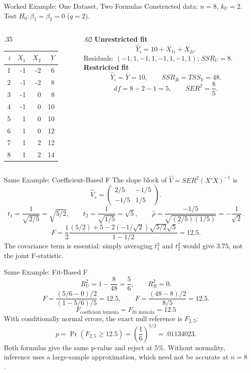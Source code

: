 \documentclass[notes,10pt, aspectratio=169]{beamer}
\begin{document}
\begin{frame}{Worked Example: One Dataset, Two Formulas}
Constructed data: $n=8$, $k_U=2$. Test $H_0:\beta_1=\beta_2=0$ ($q=2$).
\begin{columns}[T]
\begin{column}{.35\textwidth}
\begin{center}
\begin{tabular}{rrrr}
\toprule
$i$&$X_1$&$X_2$&$Y$\\\midrule
1&-1&-2&6\\
2&-1&-2&8\\
3&-1&0&8\\
4&-1&0&10\\
5&1&0&10\\
6&1&0&12\\
7&1&2&12\\
8&1&2&14\\\bottomrule
\end{tabular}
\end{center}
\end{column}
\begin{column}{.62\textwidth}
\textbf{Unrestricted fit}
\[\widehat Y_i=10+X_{1i}+X_{2i}.\]
Residuals: $(-1,1,-1,1,-1,1,-1,1)$; $SSR_U=8$.\\[1em]
\textbf{Restricted fit}
\[\widehat Y_i=\bar Y=10,\qquad SSR_R=TSS_Y=48.\]
\[df=8-2-1=5,\qquad SER^2=\frac85.\]
\end{column}
\end{columns}
\end{frame}

\begin{frame}{Same Example: Coefficient-Based F}
The slope block of $\widehat V=SER^2(X'X)^{-1}$ is
\[\widehat V_s=\begin{pmatrix}2/5&-1/5\\-1/5&1/5\end{pmatrix}.\]
\[t_1=\frac1{\sqrt{2/5}}=\sqrt{5/2},\qquad
 t_2=\frac1{\sqrt{1/5}}=\sqrt5,\qquad
 \hat\rho=\frac{-1/5}{\sqrt{(2/5)(1/5)}}=-\frac1{\sqrt2}.\]
\[F=\frac12\frac{(5/2)+5-2(-1/\sqrt2)\sqrt{5/2}\sqrt5}{1-1/2}
=\boxed{12.5}.\]
The covariance term is essential: simply averaging $t_1^2$ and $t_2^2$ would give $3.75$, not the joint F-statistic.
\end{frame}

\begin{frame}{Same Example: Fit-Based F}
\[R_U^2=1-\frac8{48}=\frac56,\qquad R_R^2=0.\]
\[F=\frac{(5/6-0)/2}{(1-5/6)/5}=12.5,\qquad
F=\frac{(48-8)/2}{8/5}=12.5.\]
\[\boxed{F_{\text{coefficient formula}}=F_{\text{fit formula}}=12.5}\]
With conditionally normal errors, the exact null reference is $F_{2,5}$:
\[p=\Pr(F_{2,5}\geq12.5)=\left(\frac16\right)^{5/2}=.01134023.\]
Both formulas give the same p-value and reject at 5\%. Without normality, inference uses a large-sample approximation, which need not be accurate at $n=8$.
\end{frame}
\end{document}
